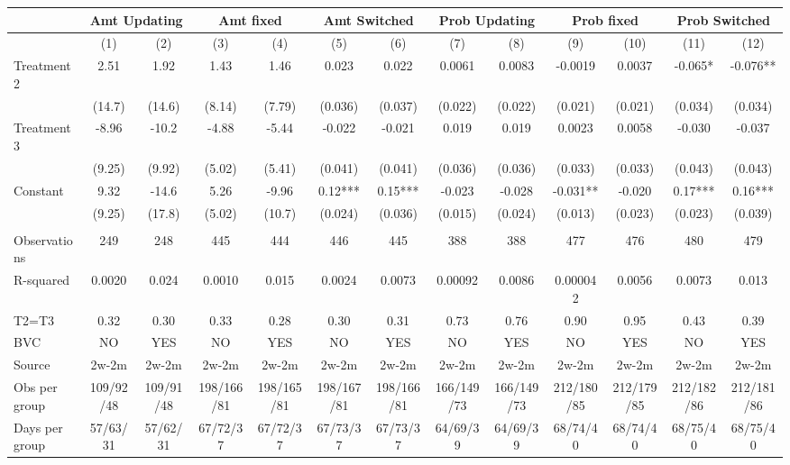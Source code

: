 \begin{tabular}{lcccccccccccc}
\toprule
      & \multicolumn{2}{c}{Amt Updating } & \multicolumn{2}{c}{Amt fixed} & \multicolumn{2}{c}{Amt Switched } & \multicolumn{2}{c}{Prob Updating } & \multicolumn{2}{c}{Prob fixed} & \multicolumn{2}{c}{Prob Switched } \\
\midrule
\midrule
      & (1)   & (2)   & (3)   & (4)   & (5)   & (6)   & (7)   & (8)   & (9)   & (10)  & (11)  & (12) \\
\midrule
\midrule
Treatment 2 & 2.51  & 1.92  & 1.43  & 1.46  & 0.023 & 0.022 & 0.0061 & 0.0083 & -0.0019 & 0.0037 & -0.065* & -0.076** \\
      & (14.7) & (14.6) & (8.14) & (7.79) & (0.036) & (0.037) & (0.022) & (0.022) & (0.021) & (0.021) & (0.034) & (0.034) \\
Treatment 3 & -8.96 & -10.2 & -4.88 & -5.44 & -0.022 & -0.021 & 0.019 & 0.019 & 0.0023 & 0.0058 & -0.030 & -0.037 \\
      & (9.25) & (9.92) & (5.02) & (5.41) & (0.041) & (0.041) & (0.036) & (0.036) & (0.033) & (0.033) & (0.043) & (0.043) \\
Constant & 9.32  & -14.6 & 5.26  & -9.96 & 0.12*** & 0.15*** & -0.023 & -0.028 & -0.031** & -0.020 & 0.17*** & 0.16*** \\
      & (9.25) & (17.8) & (5.02) & (10.7) & (0.024) & (0.036) & (0.015) & (0.024) & (0.013) & (0.023) & (0.023) & (0.039) \\
      &       &       &       &       &       &       &       &       &       &       &       &  \\
\midrule
Observations & 249   & 248   & 445   & 444   & 446   & 445   & 388   & 388   & 477   & 476   & 480   & 479 \\
R-squared & 0.0020 & 0.024 & 0.0010 & 0.015 & 0.0024 & 0.0073 & 0.00092 & 0.0086 & 0.000042 & 0.0056 & 0.0073 & 0.013 \\
T2=T3 & 0.32  & 0.30  & 0.33  & 0.28  & 0.30  & 0.31  & 0.73  & 0.76  & 0.90  & 0.95  & 0.43  & 0.39 \\
BVC   & NO    & YES   & NO    & YES   & NO    & YES   & NO    & YES   & NO    & YES   & NO    & YES \\
Source & 2w-2m & 2w-2m & 2w-2m & 2w-2m & 2w-2m & 2w-2m & 2w-2m & 2w-2m & 2w-2m & 2w-2m & 2w-2m & 2w-2m \\
Obs per group & 109/92/48 & 109/91/48 & 198/166/81 & 198/165/81 & 198/167/81 & 198/166/81 & 166/149/73 & 166/149/73 & 212/180/85 & 212/179/85 & 212/182/86 & 212/181/86 \\
Days per group & 57/63/31 & 57/62/31 & 67/72/37 & 67/72/37 & 67/73/37 & 67/73/37 & 64/69/39 & 64/69/39 & 68/74/40 & 68/74/40 & 68/75/40 & 68/75/40 \\
\bottomrule
\bottomrule
\end{tabular}%

